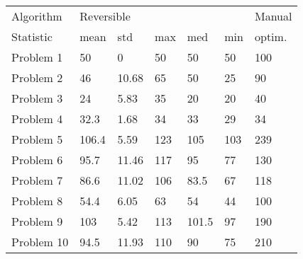 \begin{tabular}{lllllll}
\toprule
Algorithm & \multicolumn{5}{l}{Reversible} & Manual \\
Statistic &       mean &    std &  max &    med &  min & optim. \\
\midrule
Problem 1  &         50 &      0 &   50 &     50 &   50 &    100 \\
Problem 2  &         46 &  10.68 &   65 &     50 &   25 &     90 \\
Problem 3  &         24 &   5.83 &   35 &     20 &   20 &     40 \\
Problem 4  &       32.3 &   1.68 &   34 &     33 &   29 &     34 \\
Problem 5  &      106.4 &   5.59 &  123 &    105 &  103 &    239 \\
Problem 6  &       95.7 &  11.46 &  117 &     95 &   77 &    130 \\
Problem 7  &       86.6 &  11.02 &  106 &   83.5 &   67 &    118 \\
Problem 8  &       54.4 &   6.05 &   63 &     54 &   44 &    100 \\
Problem 9  &        103 &   5.42 &  113 &  101.5 &   97 &    190 \\
Problem 10 &       94.5 &  11.93 &  110 &     90 &   75 &    210 \\
\bottomrule
\end{tabular}
